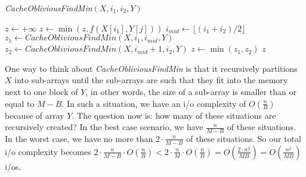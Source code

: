 \documentclass{article}
\newcommand{\io}{{\sc i/o}\xspace}
\newcommand{\ios}{{\io}s\xspace}
\newcounter{rcounter}
\newenvironment{rlist}%
{\begin{list}{\setnr-\arabic{rcounter}}{\usecounter{rcounter}}}{\end{list}}
\begin{document}
\begin{rlist}
\begin{enumerate}
            \emph{CacheObliviousFindMin}$(X, i_1, i_2, Y)$
            \begin{algorithmic}[1]
                    \State $z \gets +\infty$
                        \State $z \gets \min (z, f(X[i_1],Y[j]) )$
                   \EndFor
                \Else
                    \State $i_{mid} \gets \lfloor (i_1 + i_2) / 2 \rfloor$
                    \State $z_1 \gets CacheObliviousFindMin(X, i_1, i_{mid}, Y)$
                    \State $z_2 \gets CacheObliviousFindMin(X, i_{mid} + 1, i_2, Y)$
                    \State $z \gets \min (z_1, z_2)$
                \EndIf
                \State \Return $z$
            \end{algorithmic}
            
            One way to think about \emph{CacheObliviousFindMin} is that it recursively partitions $X$ into sub-arrays until the sub-arrays are such that they fit into the memory next to one block of $Y$, in other words, the size of a sub-array is smaller than or equal to $M-B$. In such a situation, we have an \io complexity of $O(\frac{n}{B})$ because of array $Y$. The question now is: how many of these situations are recursively created? In the best case scenario, we have $\frac{n}{M-B}$ of these situations. In the worst case, we have no more than $2 \cdot \frac{n}{M-B}$ of these situations. So our total \io complexity becomes $2 \cdot \frac{n}{M-B} \cdot O(\frac{n}{B}) < 2 \cdot \frac{n}{M} \cdot O(\frac{n}{B}) = O(\frac{2 \cdot n^2}{MB}) = O(\frac{n^2}{MB})$ \ios.
    \end{enumerate}

\end{rlist}

\renewcommand{\setnr}{IO.II}
\end{document}
